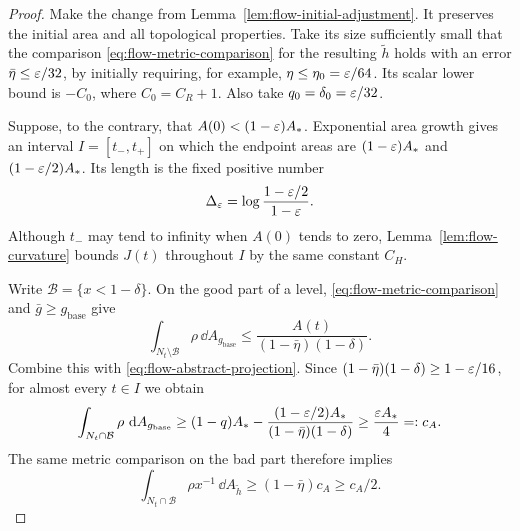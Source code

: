 \begin{proof}
Make the change from Lemma~\ref{lem:flow-initial-adjustment}.  It
preserves the initial area and all topological properties.  Take its
size sufficiently small that the comparison
\eqref{eq:flow-metric-comparison} for the resulting $\widetilde h$
holds with an error $\bar\eta\le\varepsilon/32$, by initially requiring,
for example, $\eta\le\eta_0=\varepsilon/64$.  Its scalar lower bound is
$-C_0$, where $C_0=C_R+1$.  Also take
$q_0=\delta_0=\varepsilon/32$.

Suppose, to the contrary, that $A(0)<(1-\varepsilon)A_*$.  Exponential area
growth gives an interval $I=[t_-,t_+]$ on which the endpoint areas
are $(1-\varepsilon)A_*$ and $(1-\varepsilon/2)A_*$.  Its length is the fixed
positive number
\begin{equation}\label{eq:flow-time-window}
 \Delta_\varepsilon=\log\frac{1-\varepsilon/2}{1-\varepsilon}.
\end{equation}
Although $t_-$ may tend to infinity when $A(0)$ tends to zero,
Lemma~\ref{lem:flow-curvature} bounds $J(t)$ throughout $I$ by the
same constant $C_H$.

Write $\mathcal B=\{x<1-\delta\}$.  On the good part of a level,
\eqref{eq:flow-metric-comparison} and $\bar g\ge g_{\mathrm{base}}$
give
\begin{equation}\label{eq:flow-good-area}
 \int_{N_t\setminus\mathcal B}\rho\,\dd A_{g_{\mathrm{base}}}
 \le\frac{A(t)}{(1-\bar\eta)(1-\delta)}.
\end{equation}
Combine this with \eqref{eq:flow-abstract-projection}.  Since
$(1-\bar\eta)(1-\delta)\ge1-\varepsilon/16$, for almost every $t\in I$
we obtain
\begin{equation}\label{eq:flow-bad-area-lower}
 \int_{N_t\cap\mathcal B}\rho\,\mathop{}\!\mathrm d A_{g_{\mathrm{base}}}
 \ge (1-q)A_*
       -\frac{(1-\varepsilon/2)A_*}{(1-\bar\eta)(1-\delta)}
 \ge \frac{\varepsilon A_*}{4}=:c_A.
\end{equation}
The same metric comparison on the bad part therefore implies
\begin{equation}\label{eq:flow-weighted-area-lower}
 \int_{N_t\cap\mathcal B}\rho x^{-1}\,\dd A_{\widetilde h}
 \ge(1-\bar\eta)c_A\ge c_A/2.
\end{equation}


\end{proof}
